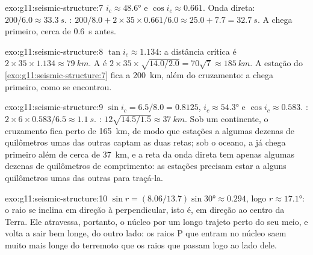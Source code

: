 \begin{solution}{exo:g11:seismic-structure:7}
$i_c \approx \ang{48.6}$ e $\cos i_c \approx 0.661$. Onda direta: $200/6.0
\approx \qty{33.3}{s}$. : $200/8.0 + 2 \times 35 \times 0.661/6.0
\approx 25.0 + 7.7 = \qty{32.7}{s}$. A  chega primeiro, cerca de
\qty{0.6}{s} antes.
\end{solution}

\begin{solution}{exo:g11:seismic-structure:8}
$\tan i_c \approx 1.134$: a distância crítica é $2 \times 35 \times 1.134
\approx \qty{79}{km}$. A  é $2 \times 35 \times
\sqrt{14.0/2.0} = 70\sqrt 7 \approx \qty{185}{km}$. A estação do
\cref{exo:g11:seismic-structure:7} fica a \qty{200}{km}, além do
cruzamento: a  chega primeiro, como se encontrou.
\end{solution}

\begin{solution}{exo:g11:seismic-structure:9}
$\sin i_c = 6.5/8.0 = 0.8125$, $i_c \approx \ang{54.3}$ e $\cos i_c \approx
0.583$. : $2 \times 6 \times 0.583/6.5 \approx \qty{1.1}{s}$.
: $12\sqrt{14.5/1.5} \approx \qty{37}{km}$. Sob um
continente, o cruzamento fica perto de \qty{165}{km}, de modo que estações
a algumas dezenas de quilômetros umas das outras captam as duas retas; sob o
oceano, a  já chega primeiro além de cerca de \qty{37}{km}, e a
reta da onda direta tem apenas algumas dezenas de quilômetros de
comprimento: as estações precisam estar a alguns quilômetros umas das outras
para traçá-la.
\end{solution}

\begin{solution}{exo:g11:seismic-structure:10}
$\sin r = (8.06/13.7)\sin\ang{30} \approx 0.294$, logo $r \approx \ang{17.1}$:
o raio se inclina em direção à perpendicular, isto é, em direção ao centro
da Terra. Ele atravessa, portanto, o núcleo por um longo trajeto perto do seu
meio, e volta a sair bem longe, do outro lado: os raios P que entram no
núcleo saem muito mais longe do terremoto que os raios que passam logo ao
lado dele.
\end{solution}

